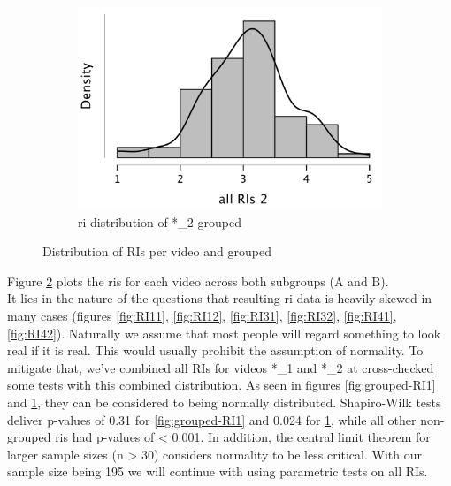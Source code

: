 \documentclass[
  a4paper,  %
  twoside,  %
  bibliography=totoc,
  headsepline,
  cleardoublepage=empty,
  parskip=half,
  draft=false
]{scrbook}
\begin{document}
\begin{figure}[h]
\begin{subfigure}{0.4\textwidth}
    \includegraphics[width=\linewidth]{graphics/images/statistics/RIs/RI2_all.png}
    \caption{\gls{ri} distribution of *\_2 grouped}
    \label{fig:grouped-RI2}
  \end{subfigure}
  \caption{Distribution of RIs per video and grouped}
  \label{fig:all-RIs}
\end{figure}

 Figure \ref{fig:all-RIs} plots the \gls{ri}s for each video across both subgroups (A and B). \\
 It lies in the nature of the questions that resulting \gls{ri} data is heavily skewed in many cases (figures \ref{fig:RI11}, \ref{fig:RI12}, \ref{fig:RI31}, \ref{fig:RI32}, \ref{fig:RI41}, \ref{fig:RI42}). Naturally we assume that most people will regard something to look real if it is real. This would usually prohibit the assumption of normality. To mitigate that, we've combined all RIs for videos *\_1 and *\_2 at cross-checked some tests with this combined distribution. As seen in figures \ref{fig:grouped-RI1} and \ref{fig:grouped-RI2}, they can be considered to being normally distributed. Shapiro-Wilk tests deliver p-values of 0.31 for \ref{fig:grouped-RI1} and 0.024 for \ref{fig:grouped-RI2}, while all other non-grouped \gls{ri}s had p-values of < 0.001. In addition, the central limit theorem for larger sample sizes (n > 30) considers normality to be less critical. With our sample size being 195 we will continue with using parametric tests on all RIs.
\end{document}
